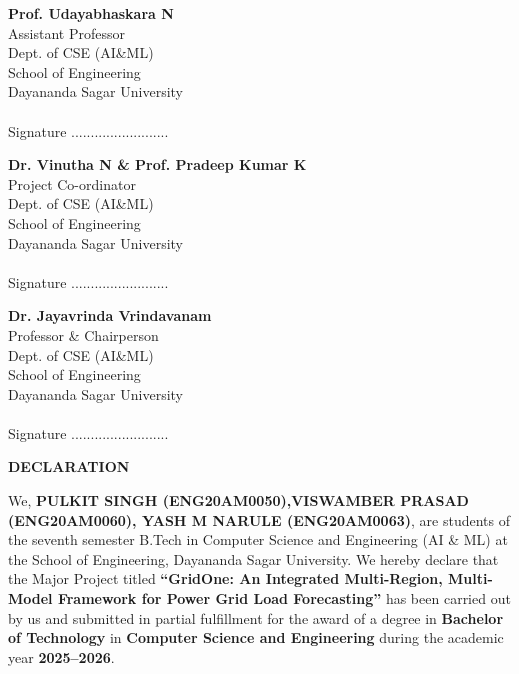\documentclass[12pt,a4paper,twoside,fleqn]{report}
\begin{document}
\vspace{15mm}
\noindent
\begin{minipage}[t]{0.31\textwidth}
\small
  \textbf{Prof. Udayabhaskara N}\\
  Assistant Professor\\
  Dept. of CSE (AI\&ML)\\
  School of Engineering\\
  Dayananda Sagar University\\
  \\
  Signature .........................\\
\end{minipage}%
\hfill
\begin{minipage}[t]{0.31\textwidth}
\small
  \textbf{Dr. Vinutha N \& Prof. Pradeep Kumar K}\\
  Project Co-ordinator\\
  Dept. of CSE (AI\&ML)\\
  School of Engineering\\
  Dayananda Sagar University\\
  \\
  Signature .........................\\
\end{minipage}%
\hfill
\begin{minipage}[t]{0.34\textwidth}
\small
  \textbf{Dr. Jayavrinda Vrindavanam}\\
  Professor \& Chairperson\\
  Dept. of CSE (AI\&ML)\\
  School of Engineering\\
  Dayananda Sagar University \\
  \\
  Signature .........................\\
\end{minipage}

\newpage
\thisfancypage{
  \setlength{\fboxsep}{20pt}\doublebox}{}
  \begin{center}
    \huge\textbf{DECLARATION}
\end{center}
\vspace{15mm}
We, \textbf{PULKIT SINGH (ENG20AM0050),VISWAMBER PRASAD (ENG20AM0060), YASH M NARULE (ENG20AM0063)}, are students of the seventh semester B.Tech in Computer Science and Engineering (AI \& ML) at the School of Engineering, Dayananda Sagar University. We hereby declare that the Major Project titled \textbf{“GridOne: An Integrated Multi-Region, Multi-Model Framework for Power Grid Load Forecasting”} has been carried out by us and submitted in partial fulfillment for the award of a degree in \textbf{Bachelor of Technology} in \textbf{Computer Science and Engineering} during the academic year \textbf{2025--2026}.
\vspace{25 mm}
\end{document}
